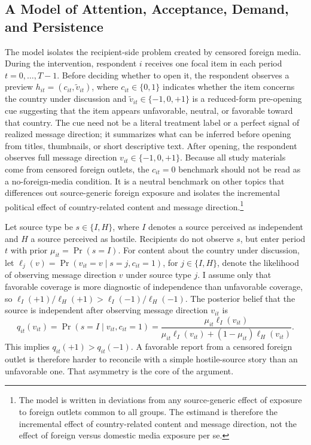 \documentclass[12pt,american]{article}
\begin{document}
	\subsection*{A Model of Attention, Acceptance, Demand, and Persistence}
	
	The model isolates the recipient-side problem created by censored foreign media. During the intervention, respondent \(i\) receives one focal item in each period \(t=0,\dots,T-1\). Before deciding whether to open it, the respondent observes a preview \(h_{it}=(c_{it},\tilde v_{it})\), where \(c_{it}\in\{0,1\}\) indicates whether the item concerns the country under discussion and \(\tilde v_{it}\in\{-1,0,+1\}\) is a reduced-form pre-opening cue suggesting that the item appears unfavorable, neutral, or favorable toward that country. The cue need not be a literal treatment label or a perfect signal of realized message direction; it summarizes what can be inferred before opening from titles, thumbnails, or short descriptive text. After opening, the respondent observes full message direction \(v_{it}\in\{-1,0,+1\}\). Because all study materials come from censored foreign outlets, the \(c_{it}=0\) benchmark should not be read as a no-foreign-media condition. It is a neutral benchmark on other topics that differences out source-generic foreign exposure and isolates the incremental political effect of country-related content and message direction.\footnote{The model is written in deviations from any source-generic effect of exposure to foreign outlets common to all groups. The estimand is therefore the incremental effect of country-related content and message direction, not the effect of foreign versus domestic media exposure per se.}
	
	Let source type be \(s\in\{I,H\}\), where \(I\) denotes a source perceived as independent and \(H\) a source perceived as hostile. Recipients do not observe \(s\), but enter period \(t\) with prior \(\mu_{it}=\Pr(s=I)\). For content about the country under discussion, let \(\ell_j(v)=\Pr(v_{it}=v\mid s=j,c_{it}=1)\), for \(j\in\{I,H\}\), denote the likelihood of observing message direction \(v\) under source type \(j\). I assume only that favorable coverage is more diagnostic of independence than unfavorable coverage, so \(\ell_I(+1)/\ell_H(+1)>\ell_I(-1)/\ell_H(-1)\). The posterior belief that the source is independent after observing message direction \(v_{it}\) is
	\[
	q_{it}(v_{it})=\Pr(s=I\mid v_{it},c_{it}=1)
	=\frac{\mu_{it}\ell_I(v_{it})}{\mu_{it}\ell_I(v_{it})+(1-\mu_{it})\ell_H(v_{it})}.
	\]
	This implies \(q_{it}(+1)>q_{it}(-1)\).
	A favorable report from a censored foreign outlet is therefore harder to reconcile with a simple hostile-source story than an unfavorable one. That asymmetry is the core of the argument.
	
\end{document}
